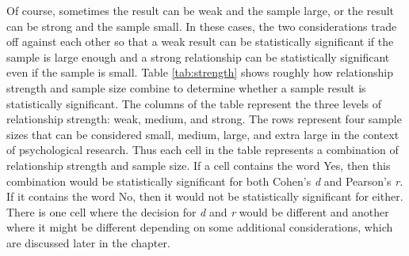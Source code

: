 \documentclass[
]{krantz}
\begin{document}
Of course, sometimes the result can be weak and the sample large, or the result can be strong and the sample small. In these cases, the two considerations trade off against each other so that a weak result can be statistically significant if the sample is large enough and a strong relationship can be statistically significant even if the sample is small. Table \ref{tab:strength} shows roughly how relationship strength and sample size combine to determine whether a sample result is statistically significant. The columns of the table represent the three levels of relationship strength: weak, medium, and strong. The rows represent four sample sizes that can be considered small, medium, large, and extra large in the context of psychological research. Thus each cell in the table represents a combination of relationship strength and sample size. If a cell contains the word Yes, then this combination would be statistically significant for both Cohen's \emph{d} and Pearson's \emph{r.} If it contains the word No, then it would not be statistically significant for either. There is one cell where the decision for \emph{d} and \emph{r} would be different and another where it might be different depending on some additional considerations, which are discussed later in the chapter.
\end{document}
